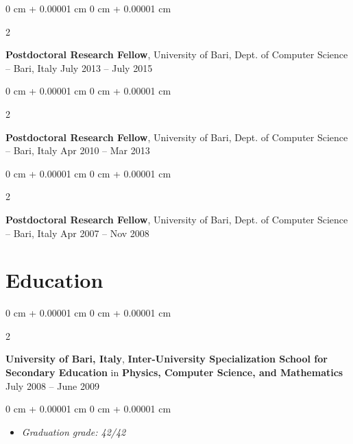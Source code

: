 \documentclass[10pt, a4paper]{article}
\newenvironment{highlights}{
    \begin{itemize}[
        topsep=0.10 cm,
        parsep=0.10 cm,
        partopsep=0pt,
        itemsep=0pt,
        leftmargin=0 cm + 10pt
    ]
}{
    \end{itemize}
} %
\newenvironment{onecolentry}{
    \begin{adjustwidth}{
        0 cm + 0.00001 cm
    }{
        0 cm + 0.00001 cm
    }
}{
    \end{adjustwidth}
} %
\newenvironment{twocolentry}[2][]{
    \onecolentry
    \def\secondColumn{#2}
    \setcolumnwidth{\fill, 4.5 cm}
    \begin{paracol}{2}
}{
    \switchcolumn \raggedleft \secondColumn
    \end{paracol}
    \endonecolentry
} %
\begin{document}
        \vspace{0.2 cm}

        \begin{twocolentry}{
            July 2013 – July 2015
        }
            \textbf{Postdoctoral Research Fellow}, University of Bari, Dept. of Computer Science -- Bari, Italy\end{twocolentry}



        \vspace{0.2 cm}

        \begin{twocolentry}{
            Apr 2010 – Mar 2013
        }
            \textbf{Postdoctoral Research Fellow}, University of Bari, Dept. of Computer Science -- Bari, Italy\end{twocolentry}



        \vspace{0.2 cm}

        \begin{twocolentry}{
            Apr 2007 – Nov 2008
        }
            \textbf{Postdoctoral Research Fellow}, University of Bari, Dept. of Computer Science -- Bari, Italy\end{twocolentry}




    
    \section{Education}



        
        \begin{twocolentry}{
            July 2008 – June 2009
        }
            \textbf{University of Bari, Italy}, \textbf{Inter-University Specialization School for Secondary Education} in \textbf{Physics, Computer Science, and Mathematics}\end{twocolentry}

        \vspace{0.10 cm}
        \begin{onecolentry}
            \begin{highlights}
                \item \textit{Graduation grade: 42/42}
            \end{highlights}
        \end{onecolentry}


        \vspace{0.2 cm}
\end{document}
